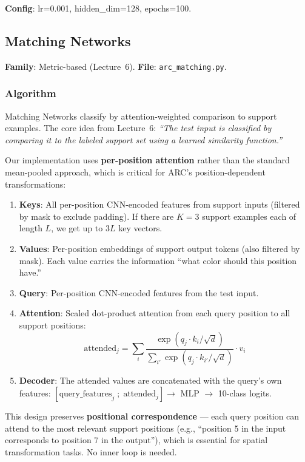 \documentclass[11pt,a4paper]{article}
\begin{document}
\textbf{Config}: lr=0.001, hidden\_dim=128, epochs=100.

\subsection{Matching Networks~\cite{vinyals2016}}
\textbf{Family}: Metric-based (Lecture~6). \textbf{File}: \texttt{arc\_matching.py}.

\subsubsection{Algorithm}
Matching Networks classify by attention-weighted comparison to support examples. The core idea from Lecture~6: \emph{``The test input is classified by comparing it to the labeled support set using a learned similarity function.''}

Our implementation uses \textbf{per-position attention} rather than the standard mean-pooled approach, which is critical for ARC's position-dependent transformations:
\begin{enumerate}[nosep]
  \item \textbf{Keys}: All per-position CNN-encoded features from support inputs (filtered by mask to exclude padding). If there are $K=3$ support examples each of length $L$, we get up to $3L$ key vectors.
  \item \textbf{Values}: Per-position embeddings of support output tokens (also filtered by mask). Each value carries the information ``what color should this position have.''
  \item \textbf{Query}: Per-position CNN-encoded features from the test input.
  \item \textbf{Attention}: Scaled dot-product attention from each query position to all support positions:
  \begin{equation}
    \text{attended}_j = \sum_{i} \frac{\exp(q_j \cdot k_i / \sqrt{d})}{\sum_{i'} \exp(q_j \cdot k_{i'} / \sqrt{d})} \cdot v_i
  \end{equation}
  \item \textbf{Decoder}: The attended values are concatenated with the query's own features: $[\text{query\_features}_j \;;\; \text{attended}_j] \to$ MLP $\to$ 10-class logits.
\end{enumerate}

This design preserves \textbf{positional correspondence} --- each query position can attend to the most relevant support positions (e.g., ``position 5 in the input corresponds to position 7 in the output''), which is essential for spatial transformation tasks. No inner loop is needed.
\end{document}
